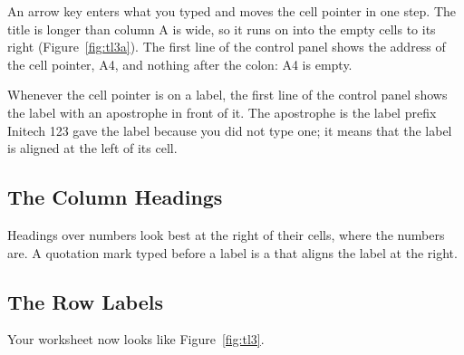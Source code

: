 \begin{Keystrokes}
\end{Keystrokes}
An arrow key enters what you typed and moves the cell pointer in one step.
The title is longer than column A is wide, so it runs on into the empty
cells to its right (Figure~\ref{fig:tl3a}).  The first line of the control
panel shows the address of the cell pointer, A4, and nothing after the
colon: A4 is empty.

Whenever the cell pointer is on a label, the first line of the control
panel shows the label with an apostrophe in front of it.  The apostrophe is
the label prefix Initech 123 gave the label because you did not type one;
it means that the label is aligned at the left of its cell.

\subsection{The Column Headings}
Headings over numbers look best at the right of their cells, where the
numbers are.  A quotation mark typed before a label is a  that aligns the label at the right.

\begin{Keystrokes}
\end{Keystrokes}

\subsection{The Row Labels}
\begin{Keystrokes}
\end{Keystrokes}
Your worksheet now looks like Figure~\ref{fig:tl3}.

